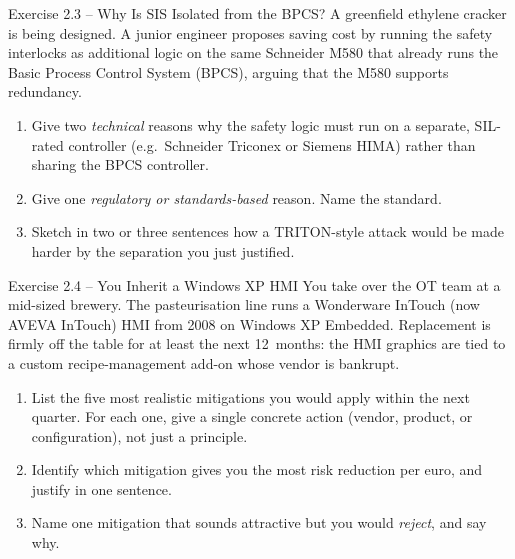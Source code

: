 \documentclass[11pt,a4paper]{article}
\begin{document}
\begin{taskbox}{Exercise 2.3 -- Why Is SIS Isolated from the BPCS?}
A green\-field ethylene cracker is being designed. A junior engineer
proposes saving cost by running the safety interlocks as additional logic
on the same Schneider M580 that already runs the Basic Process Control
System (BPCS), arguing that the M580 supports redundancy.
\begin{enumerate}
  \item Give two \emph{technical} reasons why the safety logic must run on a
    separate, SIL-rated controller (e.g.\ Schneider Triconex or Siemens
    HIMA) rather than sharing the BPCS controller.
  \item Give one \emph{regulatory or standards-based} reason. Name the
    standard.
  \item Sketch in two or three sentences how a TRITON-style attack would be
    made harder by the separation you just justified.
\end{enumerate}
\end{taskbox}

\begin{taskbox}{Exercise 2.4 -- You Inherit a Windows XP HMI}
You take over the OT team at a mid-sized brewery. The pasteurisation line
runs a Wonderware InTouch (now AVEVA InTouch) HMI from 2008 on Windows XP
Embedded. Replacement is firmly off the table for at least the next
12~months: the HMI graphics are tied to a custom recipe-management add-on
whose vendor is bankrupt.
\begin{enumerate}
  \item List the five most realistic mitigations you would apply within the
    next quarter. For each one, give a single concrete action (vendor,
    product, or configuration), not just a principle.
  \item Identify which mitigation gives you the most risk reduction per euro,
    and justify in one sentence.
  \item Name one mitigation that sounds attractive but you would
    \emph{reject}, and say why.
\end{enumerate}
\end{taskbox}
\end{document}
